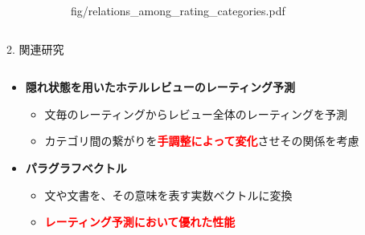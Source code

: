 \documentclass[unicode,10pt]{beamer}
\newlength{\mycolumnwidth}
\newcommand{\itemtitle}[1]{\textbf{#1}\\}
\newcommand{\fire}[1]{\textcolor{red}{\textbf{#1}}}
\begin{document}
\begin{frame}
\begin{columns}[onlytextwidth,t]
\begin{column}{\mycolumnwidth}
\begin{figure}
\begin{subfigure}[t]{0.5\linewidth}
                        {fig/relations_among_rating_categories.pdf}
      \end{subfigure}
      \hspace*{\fill} %
    \end{figure}
  \end{column}
\end{columns}

\begin{block}{2. 関連研究}
  \begin{columns}[onlytextwidth,t]
    \begin{column}{\mycolumnwidth}
      \begin{itemize}
        \item \itemtitle{隠れ状態を用いたホテルレビューのレーティング予測
                         \cite{fujitani15}}
          \begin{itemize}
            \item 文毎のレーティングからレビュー全体のレーティングを予測
            \item カテゴリ間の繋がりを\fire{手調整によって変化}させその関係を考慮
          \end{itemize}
        \item \itemtitle{パラグラフベクトル\cite{quoc14}}
          \begin{itemize}
            \item 文や文書を、その意味を表す実数ベクトルに変換
            \item \fire{レーティング予測において優れた性能}
          \end{itemize}
      \end{itemize}
    \end{column}


\end{columns}
\end{block}
\end{frame}
\end{document}
